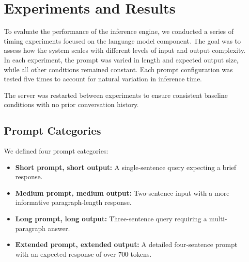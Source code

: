 \documentclass[twocolumn]{article}
\begin{document}
\section{Experiments and Results}
To evaluate the performance of the inference engine, we conducted a series of timing experiments focused on the language model component. The goal was to assess how the system scales with different levels of input and output complexity. In each experiment, the prompt was varied in length and expected output size, while all other conditions remained constant. Each prompt configuration was tested five times to account for natural variation in inference time.

The server was restarted between experiments to ensure consistent baseline conditions with no prior conversation history.

\subsection{Prompt Categories}
We defined four prompt categories:
\begin{itemize}
    \item \textbf{Short prompt, short output:} A single-sentence query expecting a brief response.
    \item \textbf{Medium prompt, medium output:} Two-sentence input with a more informative paragraph-length response.
    \item \textbf{Long prompt, long output:} Three-sentence query requiring a multi-paragraph answer.
    \item \textbf{Extended prompt, extended output:} A detailed four-sentence prompt with an expected response of over 700 tokens.
\end{itemize}
\end{document}

